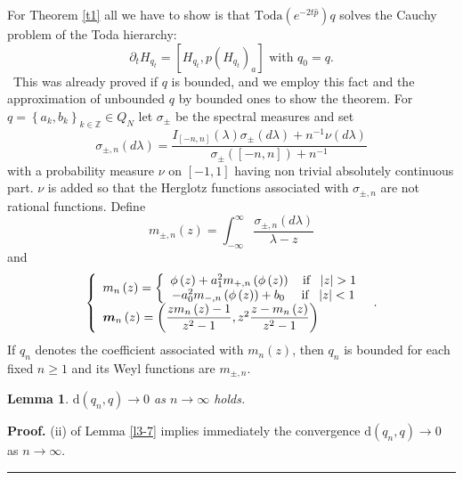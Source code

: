 \documentclass[a4paper]{article}%
\newtheorem{lemma}{Lemma}
\newenvironment{proof}[1][Proof]{\noindent\textbf{#1.} }{\ \rule{0.5em}{0.5em}}
\begin{document}
For Theorem \ref{t1} all we have to show is that $\mathrm{Toda}\left(
e^{-2t\widehat{p}}\right)  q$ solves the Cauchy problem of the Toda hierarchy:%
\[
\partial_{t}H_{q_{t}}=\left[  H_{q_{t}},p\left(  H_{q_{t}}\right)
_{a}\right]  \text{ \ with }q_{0}=q\text{.}%
\]
\ This was already proved if $q$ is bounded, and we employ this fact and the
approximation of unbounded $q$ by bounded ones to show the theorem. For
$q=\left\{  a_{k},b_{k}\right\}  _{k\in\mathbb{Z}}\in Q_{N}$ let $\sigma_{\pm
}$ be the spectral measures and set%
\[
\sigma_{\pm,n}\left(  d\lambda\right)  =\dfrac{I_{\left[  -n,n\right]
}\left(  \lambda\right)  \sigma_{\pm}\left(  d\lambda\right)  +n^{-1}%
\nu\left(  d\lambda\right)  }{\sigma_{\pm}\left(  \left[  -n,n\right]
\right)  +n^{-1}}%
\]
with a probability measure $\nu$ on $\left[  -1,1\right]  $ having non trivial
absolutely continuous part. $\nu$ is added so that the Herglotz functions
associated with $\sigma_{\pm,n}$ are not rational functions. Define%
\[
m_{\pm,n}\left(  z\right)  =\int_{-\infty}^{\infty}\dfrac{\sigma_{\pm
,n}\left(  d\lambda\right)  }{\lambda-z}%
\]
and%
\[
\left\{
\begin{array}
[c]{l}%
m_{n}\left(  z\right)  =\left\{
\begin{array}
[c]{c}%
\phi\left(  z\right)  +a_{1}^{2}m_{+,n}\left(  \phi\left(  z\right)  \right)
\text{ \ \ if \ }\left\vert z\right\vert >1\\
-a_{0}^{2}m_{-,n}\left(  \phi\left(  z\right)  \right)  +b_{0}\text{ \ \ \ if
\ }\left\vert z\right\vert <1
\end{array}
\right. \\
\boldsymbol{m}_{n}\left(  z\right)  =\left(  \dfrac{zm_{n}\left(  z\right)
-1}{z^{2}-1},z^{2}\dfrac{z-m_{n}\left(  z\right)  }{z^{2}-1}\right)
\end{array}
\right.  \text{.}%
\]
If $q_{n}$ denotes the coefficient associated with $m_{n}\left(  z\right)  $,
then $q_{n}$ is bounded for each fixed $n\geq1$ and its Weyl functions are
$m_{\pm,n}$.

\begin{lemma}
\label{l4-1}$\mathrm{d}\left(  q_{n},q\right)  \rightarrow0$ as $n\rightarrow
\infty$ holds.
\end{lemma}

\begin{proof}
(ii) of Lemma \ref{l3-7} implies immediately the convergence $\mathrm{d}%
\left(  q_{n},q\right)  \rightarrow0$ as $n\rightarrow\infty$.\bigskip
\end{proof}
\end{document}
